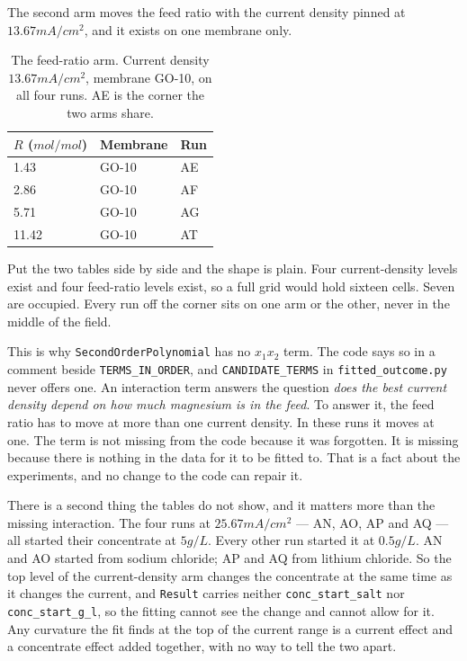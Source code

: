 The second arm moves the feed ratio with the current density pinned at
$13.67\unit{mA/cm^2}$, and it exists on one membrane only.

\begin{table}[htbp]
  \centering
  \caption{The feed-ratio arm. Current density $13.67\unit{mA/cm^2}$, membrane GO-10, on
    all four runs. AE is the corner the two arms share.}
  \label{tab:limits:ratio-arm}
  \begin{tabular}{l l l}
    \toprule
    $R$ ($\unit{mol/mol}$) & Membrane & Run \\
    \midrule
    1.43  & GO-10 & AE \\
    2.86  & GO-10 & AF \\
    5.71  & GO-10 & AG \\
    11.42 & GO-10 & AT \\
    \bottomrule
  \end{tabular}
\end{table}

Put the two tables side by side and the shape is plain. Four current-density levels exist
and four feed-ratio levels exist, so a full grid would hold sixteen cells. Seven are
occupied. Every run off the corner sits on one arm or the other, never in the middle of
the field.

This is why \texttt{SecondOrderPolynomial} has no $x_1x_2$ term. The code says so in a
comment beside \texttt{TERMS\_IN\_ORDER}, and \texttt{CANDIDATE\_TERMS} in
\texttt{fitted\_outcome.py} never offers one. An interaction term answers the question
\emph{does the best current density depend on how much magnesium is in the feed}. To
answer it, the feed ratio has to move at more than one current density. In these runs it
moves at one. The term is not missing from the code because it was forgotten. It is
missing because there is nothing in the data for it to be fitted to. That is a fact about
the experiments, and no change to the code can repair it.

There is a second thing the tables do not show, and it matters more than the missing
interaction. The four runs at $25.67\unit{mA/cm^2}$ --- AN, AO, AP and AQ --- all started
their concentrate at $5\unit{g/L}$. Every other run started it at $0.5\unit{g/L}$. AN and
AO started from sodium chloride; AP and AQ from lithium chloride. So the top level of the
current-density arm changes the concentrate at the same time as it changes the current,
and \texttt{Result} carries neither \texttt{conc\_start\_salt} nor
\texttt{conc\_start\_g\_l}, so the fitting cannot see the change and cannot allow for it.
Any curvature the fit finds at the top of the current range is a current effect and a
concentrate effect added together, with no way to tell the two apart.


